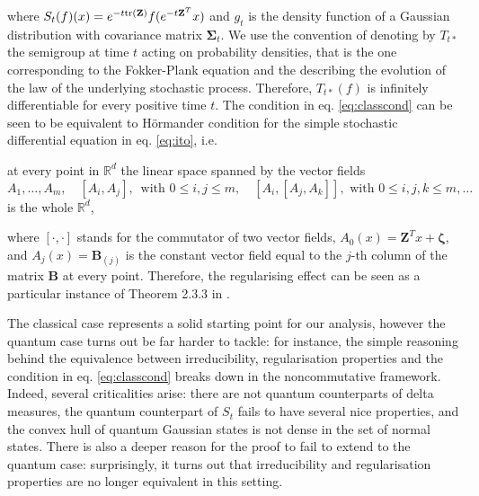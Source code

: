 \documentclass[preprint]{elsarticle}
\theoremstyle{definition}
\def\RR{\mathbb{R}}
\def\tr{{\rm tr}}
\begin{document}
where $S_t(f)(x)=e^{-t\tr(\mathbf{Z})}f(e^{-t\mathbf{Z}^T}x)$ and $g_t$ is the density function of a Gaussian distribution with covariance matrix $\boldsymbol{\Sigma}_t$. We use the convention of denoting by $T_{t*}$ the semigroup at time $t$ acting on probability densities, that is the one corresponding to the Fokker-Plank equation and the describing the evolution of the law of the underlying stochastic process. Therefore, $T_{t*}(f)$ is infinitely differentiable for every positive time $t$. The condition in eq. \eqref{eq:classcond} can be seen to be equivalent to H\"ormander condition for the simple stochastic differential equation in eq. \eqref{eq:ito}, i.e.
\begin{center} 
at every point in $\RR^{d}$ the linear space spanned by the vector fields
\begin{equation} \label{eq:clhormander}A_1, \dots, A_m, \quad [A_i,A_j],\,\text{ with } 0\leq i,j \leq m, \quad  [A_i,[A_j,A_k]],\text{ with } 0\leq i,j,k \leq m,\dots
\end{equation}
is the whole $\RR^d$,
\end{center}
where $[\cdot, \cdot]$ stands for the commutator of two vector fields, $A_0(x)=\mathbf{Z}^Tx+\boldsymbol{\zeta}$, and $A_j(x)=\mathbf{B}_{(j)}$ is the constant vector field equal to the $j$-th column of the matrix $\mathbf{B}$ at every point. Therefore, the regularising effect can be seen as a particular instance of Theorem 2.3.3 in \cite{Nu13}.

\bigskip The classical case represents a solid starting point for our analysis, however the quantum case turns out be far harder to tackle: for instance, the simple reasoning behind the equivalence between irreducibility, regularisation properties and the condition in eq. \eqref{eq:classcond} breaks down in the noncommutative framework. Indeed, several criticalities arise: there are not quantum counterparts of delta measures, the quantum counterpart of $S_t$ fails to have several nice properties, and the convex hull of quantum Gaussian states is not dense in the set of normal states. There is also a deeper reason for the proof to fail to extend to the quantum case: surprisingly, it turns out that irreducibility and regularisation properties are no longer equivalent in this setting.
\end{document}
